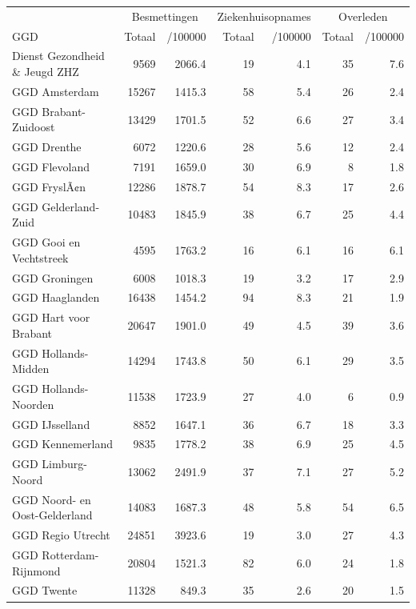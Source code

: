 \documentclass[
  english,
  man,floatsintext]{apa6}
\begin{document}
\begin{table}
\centering\begingroup\fontsize{10}{12}\selectfont

\begin{threeparttable}
\begin{tabular}{lrrrrrr}
\toprule
\multicolumn{1}{c}{ } & \multicolumn{2}{c}{Besmettingen} & \multicolumn{2}{c}{Ziekenhuisopnames} & \multicolumn{2}{c}{Overleden} \\
\cmidrule(l{3pt}r{3pt}){2-3} \cmidrule(l{3pt}r{3pt}){4-5} \cmidrule(l{3pt}r{3pt}){6-7}
GGD & Totaal & /100000 & Totaal & /100000 & Totaal & /100000\\
\midrule
Dienst Gezondheid \& Jeugd ZHZ & 9569 & 2066.4 & 19 & 4.1 & 35 & 7.6\\
GGD Amsterdam & 15267 & 1415.3 & 58 & 5.4 & 26 & 2.4\\
GGD Brabant-Zuidoost & 13429 & 1701.5 & 52 & 6.6 & 27 & 3.4\\
GGD Drenthe & 6072 & 1220.6 & 28 & 5.6 & 12 & 2.4\\
GGD Flevoland & 7191 & 1659.0 & 30 & 6.9 & 8 & 1.8\\
GGD FryslÃ¢n & 12286 & 1878.7 & 54 & 8.3 & 17 & 2.6\\
GGD Gelderland-Zuid & 10483 & 1845.9 & 38 & 6.7 & 25 & 4.4\\
GGD Gooi en Vechtstreek & 4595 & 1763.2 & 16 & 6.1 & 16 & 6.1\\
GGD Groningen & 6008 & 1018.3 & 19 & 3.2 & 17 & 2.9\\
GGD Haaglanden & 16438 & 1454.2 & 94 & 8.3 & 21 & 1.9\\
GGD Hart voor Brabant & 20647 & 1901.0 & 49 & 4.5 & 39 & 3.6\\
GGD Hollands-Midden & 14294 & 1743.8 & 50 & 6.1 & 29 & 3.5\\
GGD Hollands-Noorden & 11538 & 1723.9 & 27 & 4.0 & 6 & 0.9\\
GGD IJsselland & 8852 & 1647.1 & 36 & 6.7 & 18 & 3.3\\
GGD Kennemerland & 9835 & 1778.2 & 38 & 6.9 & 25 & 4.5\\
GGD Limburg-Noord & 13062 & 2491.9 & 37 & 7.1 & 27 & 5.2\\
GGD Noord- en Oost-Gelderland & 14083 & 1687.3 & 48 & 5.8 & 54 & 6.5\\
GGD Regio Utrecht & 24851 & 3923.6 & 19 & 3.0 & 27 & 4.3\\
GGD Rotterdam-Rijnmond & 20804 & 1521.3 & 82 & 6.0 & 24 & 1.8\\
GGD Twente & 11328 & 849.3 & 35 & 2.6 & 20 & 1.5\\

\end{tabular}
\end{threeparttable}
\end{table}
\end{document}
